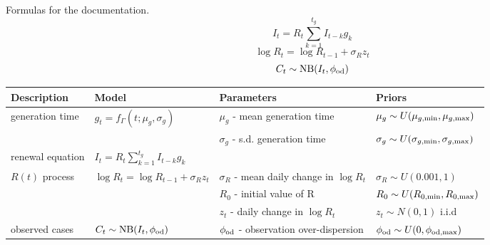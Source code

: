 \documentclass[11pt, oneside]{amsart}   	%
\begin{document}
Formulas for the documentation.
\begin{equation}
I_t = R_t \sum_{k=1}^{t_g} I_{t-k} g_k
\end{equation}
\begin{equation}
\log R_t = \log R_{t-1} + \sigma_R z_t
\end{equation}
\begin{equation}
C_t \sim {\rm NB}(I_t,\phi_{\rm od})
\end{equation}

\begin{table}[]
\begin{tabular}{l|l|l|l}
{\bf Description } & {\bf Model }&  {\bf Parameters } & {\bf  Priors  }  \\ \hline
generation time & $g_t = f_{\Gamma}(t; \mu_g,\sigma_g)$ & $\mu_g$ - mean generation time  &  $\mu_g \sim U(\mu_{g,\rm min}, \mu_{g,\rm max}) $\\
&  & $\sigma_g$ - s.d. generation time  & $\sigma_g \sim U(\sigma_{g,\rm min}, \sigma_{g,\rm max}) $ \\ \hline
renewal equation & $I_t = R_t \sum\limits_{k=1}^{t_g} I_{t-k} g_k$  & & \\ \hline
$R(t)$ process & $\log R_t = \log R_{t-1} + \sigma_R z_t$ & $\sigma_R$ - mean daily change in $\log R_t $& $\sigma_R \sim U(0.001,1)$ \\
& & $R_0$ - initial value of R & $R_0 \sim U(R_{0,\rm min}, R_{0,\rm max})$ \\
& & $z_t$ - daily change in $\log R_t $ & $z_t \sim N(0,1)$ i.i.d \\ \hline
observed cases & $C_t \sim {\rm NB}(I_t,\phi_{\rm od})$ & $\phi_{\rm od}$ - observation over-dispersion & $\phi_{\rm od} \sim U(0,\phi_{\rm od,max})$
\end{tabular}
\end{table}
\end{document}
